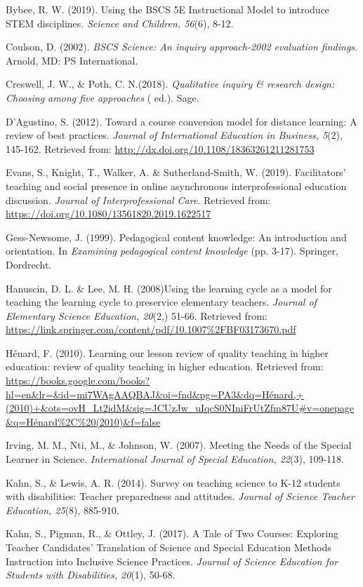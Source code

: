\documentclass[11.5pt]{sig-alternate} %
\begin{document}
Bybee, R. W. (2019). Using the BSCS 5E Instructional Model to introduce STEM disciplines. \textit{Science and Children, 56}(6), 8-12.

Coulson, D. (2002). \textit{BSCS Science: An inquiry approach-2002 evaluation findings}. Arnold, MD: PS International.

Creswell, J. W., \& Poth, C. N.(2018). \textit{Qualitative inquiry \& research design: Choosing among five approaches} ( ed.). Sage.

D'Agustino, S. (2012). Toward a course conversion model for distance learning: A review of best practices. \textit{Journal of International Education in Business, 5}(2), 145-162. Retrieved from: \url{http://dx.doi.org/10.1108/18363261211281753}

Evans, S., Knight, T., Walker, A. \& Sutherland-Smith, W. (2019). Facilitators’ teaching and social presence in online asynchronous interprofessional education discussion. \textit{Journal of Interprofessional Care}. Retrieved from: \url{https://doi.org/10.1080/13561820.2019.1622517}

Gess-Newsome, J. (1999). Pedagogical content knowledge: An introduction and orientation. In \textit{Examining pedagogical content knowledge} (pp. 3-17). Springer, Dordrecht.

Hanuscin, D. L. \& Lee, M. H. (2008)Using the learning cycle as a model for teaching the learning cycle to preservice elementary teachers. \textit{Journal of Elementary Science Education, 20}(2,) 51-66. Retrieved from: \url{https://link.springer.com/content/pdf/10.1007\%2FBF03173670.pdf}

Hénard, F. (2010). Learning our lesson review of quality teaching in higher education: review of quality teaching in higher education. Retrieved from: \url{https://books.google.com/books?hl=en\&lr=\&id=mi7WAgAAQBAJ\&oi=fnd\&pg=PA3\&dq=Hénard,+(2010)+\&ots=ovH\_Lt2idM\&sig=JCUzJw_uIqcS0NIniFrUtZfm87U\#v=onepage\&q=Hénard\%2C\%20(2010)\&f=false}

Irving, M. M., Nti, M., \& Johnson, W. (2007). Meeting the Needs of the Special Learner in Science. \textit{International Journal of Special Education, 22}(3), 109-118.

Kahn, S., \& Lewis, A. R. (2014). Survey on teaching science to K-12 students with disabilities: Teacher preparedness and attitudes. \textit{Journal of Science Teacher Education, 25}(8), 885-910.

Kahn, S., Pigman, R., \& Ottley, J. (2017). A Tale of Two Courses: Exploring Teacher Candidates' Translation of Science and Special Education Methods Instruction into Inclusive Science Practices. \textit{Journal of Science Education for Students with Disabilities, 20}(1), 50-68.
\end{document}
